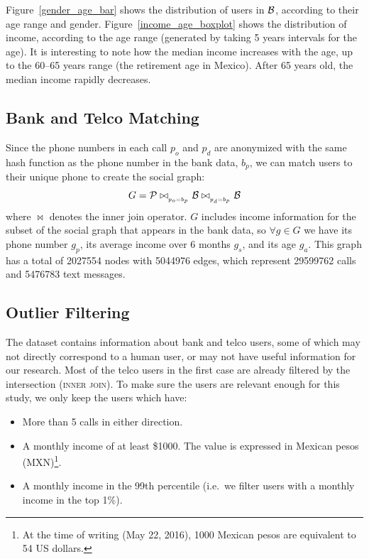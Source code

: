 Figure~\ref{gender_age_bar} shows the distribution of users in $\mathcal{B}$, according to their age range and gender.
Figure~\ref{income_age_boxplot} shows the distribution of income, according to the age range (generated by taking 5 years intervals for the age).
It is interesting to note how the median income increases with the age, up to
the 60--65 years range (the retirement age in Mexico). After 65 years old, the median income rapidly decreases.


\subsection{Bank and Telco Matching}

Since the phone numbers in each call $ p_o $ and $ p_d $ are anonymized with the same hash function as the phone number in the bank data, $ b_p $, we can match users to their unique phone to create the social graph:
$$ G = \mathcal{P} \bowtie_{_{p_o = b_p}} \mathcal{B} \bowtie_{_{p_d = b_p}} \mathcal{B} $$
where $\bowtie$ denotes the inner join operator.
$G$ includes income information for the subset of the social graph that appears in the bank data, so \( \forall g \in G \) we have its phone number \( g_p \),  its average income over 6 months \( g_s \), and its age \( g_a \).
This graph has a total of \num{2027554} nodes with \num{5044976} edges, which represent \num{29599762} calls and \num{5476783} text messages.

\subsection{Outlier Filtering}

The dataset contains information about bank and telco users, some of which may not directly correspond to a human user, %
or may not have useful information for our research.
Most of the telco users in the first case are already filtered by the intersection (\textsc{inner join}). To make sure the users are relevant enough for this study, we only keep the users which have:

\begin{itemize}
	\item More than 5 calls in either direction.
	\item A monthly income of at least \$\num{1000}.
	The value is expressed in Mexican pesos (MXN)\footnote{At the time of writing (May 22, 2016), 1000 Mexican pesos are equivalent to 54 US dollars.}.
	\item A monthly income in the \num{99}th percentile (i.e.\ we filter users with a monthly income in the top 1\%).
\end{itemize}
